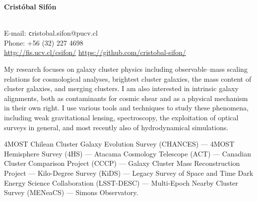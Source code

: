 \documentclass[11pt]{article}
\begin{document}
\begin{minipage}[b]{0.46\linewidth}
\flushleft
\hspace{-0.7cm}
{\bf\huge Crist\'obal Sif\'on}\\\vspace{0.2cm}
\\
\end{minipage}
\begin{minipage}[b]{0.49\linewidth}
\flushright
{\large E-mail: {\texttt cristobal.sifon@pucv.cl}\\
        Phone: +56 (32) 227 4698\\
        \url{http://fis.ucv.cl/csifon/}
        \url{https://github.com/cristobal-sifon/}}
\end{minipage}
\vspace{0.4cm}
\hline




My research focuses on galaxy cluster physics including observable--mass scaling 
relations for cosmological analyses, brightest cluster galaxies, the mass 
content of cluster galaxies, and merging clusters. I am also interested in 
intrinsic galaxy alignments, both as contaminants for cosmic shear and as a 
physical mechanism in their own right. I use various tools and techniques to 
study these phenomena, including weak gravitational lensing, spectroscopy, the 
exploitation of optical surveys in general, and most recently also of
hydrodynamical simulations.

\vspace{0.5cm}
{
 4MOST Chilean Cluster Galaxy Evolution Survey (CHANCES) ---
 4MOST Hemisphere Survey (4HS) ---
 Atacama Cosmology Telescope (ACT) ---
 Canadian Cluster Comparison Project (CCCP) ---
 Galaxy Cluster Mass Reconstruction Project ---
 Kilo-Degree Survey (KiDS) ---
 Legacy Survey of Space and Time Dark Energy Science Collaboration (LSST-DESC) ---
 Multi-Epoch Nearby Cluster Survey (MENeaCS) ---
 Simons Observatory.
}
\end{document}
